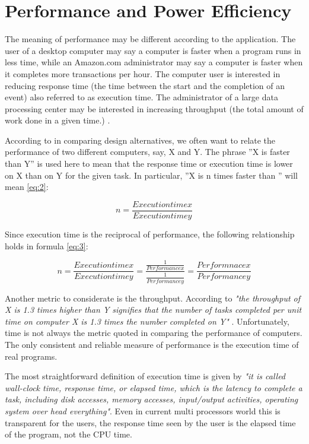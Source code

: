 \section{Performance and Power Efficiency}

\noindent

The meaning of performance may be different according to the application.
The user of a desktop computer may say a computer is faster when a program runs in less
time, while an Amazon.com administrator may say a computer is faster when it
completes more transactions per hour. The computer user is interested in 
reducing response time (the time between the start and the completion of an 
event) \cite{Hennessy} also referred to as execution time. The administrator of a large data 
processing center may be interested in increasing throughput (the total amount 
of work done in a given time.) \cite{Hennessy}. 

According to \cite{Hennessy} in comparing design alternatives, we often want to
relate the performance of two different computers, say, X and Y. The phrase ''X
is faster than Y'' is used here to mean that the response time or execution
time is lower on X than on Y for the given task. In particular, ''X is n times
faster than ''  will mean \ref{eq:2}:

\begin{equation}\label{eq:2}
n = \frac{Execution time x}{Execution time y}
\end{equation}

Since execution time is the reciprocal of performance, the following
relationship holds in formula \ref{eq:3}:

\begin{equation}\label{eq:3}
n = \frac{Execution time x}{Execution time y} = \frac{\frac{1}{Performance
x}}{\frac{1}{Performance y}} = \frac{Performnace x}{Performance y}
\end{equation}

Another metric to considerate is the throughput. According to \cite{Hennessy}
\textit{"the throughput of X is 1.3 times higher than Y signifies that the
number of tasks completed per unit time on computer X is 1.3 times the number
completed on Y"} . Unfortunately, time is not always the metric quoted in
comparing the performance of computers. The only consistent and reliable
measure of performance is the execution time of real programs. 

The most straightforward definition of execution time is given by
\cite{Hennessy} \textit{"it is called wall-clock time, response time, or elapsed
time, which is the latency to complete a task, including disk accesses, memory
accesses, input/output activities, operating system over head everything"}.
Even in current multi processors world this is transparent for the users,  the
response time seen by the user is the elapsed time of the program, not the CPU
time.

